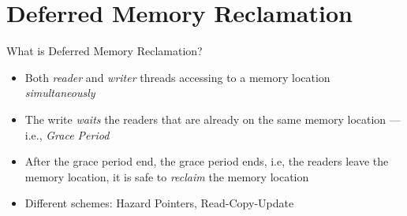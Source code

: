 \documentclass[aspectratio=169,xcolor=dvipsnames]{beamer}
\begin{document}
\section{Deferred Memory Reclamation}
\begin{frame}{What is Deferred Memory Reclamation?}
    \begin{itemize}
        \item Both \emph{reader} and \emph{writer} threads accessing to a memory location \emph{simultaneously}
        \item The write \emph{waits} the readers that are already on the same memory location --- i.e., \emph{Grace Period}
        \item After the grace period end, the grace period ends, i.e, the readers leave the memory location, it is safe to \emph{reclaim} the memory location
        \item Different schemes: Hazard Pointers, Read-Copy-Update \cite{}
    \end{itemize}
\end{frame}
\end{document}
